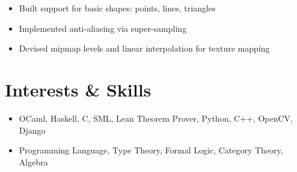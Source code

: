 \documentclass[12pt]{article}
\begin{document}
\begin{itemize}
\item Built support for basic shapes: points, lines, triangles
\item Implemented anti-aliasing via super-sampling
\item Devised mipmap levels and linear interpolation for texture mapping
\end{itemize}

\section{Interests \& Skills}

\begin{itemize}
\item OCaml, Haskell, C, SML, Lean Theorem Prover, Python, C++, OpenCV, Django
\item Programming Language, Type Theory, Formal Logic, Category Theory, Algebra
\end{itemize}
\end{document}
